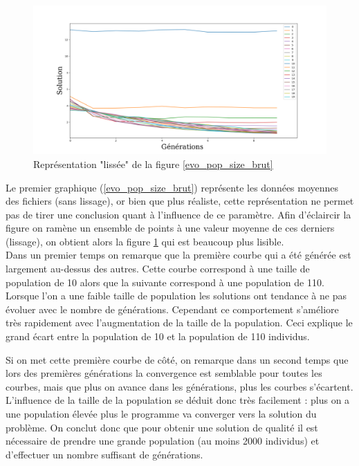 \documentclass[12pt]{report}
\begin{document}
        \begin{figure}[!]
          \centering
          \includegraphics[width=18cm]{img/evo_pop_size_moy.png}
          \caption{Représentation "lissée" de la figure \ref{evo_pop_size_brut}}
          \label{evo_pop_size_moy}
        \end{figure}
        Le premier graphique (\ref{evo_pop_size_brut}) représente les données moyennes des fichiers (sans lissage), or bien que plus réaliste, cette représentation ne permet pas de tirer une conclusion quant à l'influence de ce paramètre. Afin d'éclaircir la figure on ramène un ensemble de points à une valeur moyenne de ces derniers (lissage), on obtient alors la figure \ref{evo_pop_size_moy} qui est beaucoup plus lisible. \\

        Dans un premier temps on remarque que la première courbe qui a été générée est largement au-dessus des autres. Cette courbe correspond à une taille de population de 10 alors que la suivante correspond à une population de 110. Lorsque l'on a une faible taille de population les solutions ont tendance à ne pas évoluer avec le nombre de générations. Cependant ce comportement s'améliore très rapidement avec l'augmentation de la taille de la population. Ceci explique le grand écart entre la population de 10 et la population de 110 individus.

        Si on met cette première courbe de côté, on remarque dans un second temps que lors des premières générations la convergence est semblable pour toutes les courbes, mais que plus on avance dans les générations, plus les courbes s'écartent.
        \\ L'influence de la taille de la population se déduit donc très facilement : plus on a une population élevée plus le programme va converger vers la solution du problème. On conclut donc que pour obtenir une solution de qualité il est nécessaire de prendre une grande population (au moins 2000 individus) et d'effectuer un nombre suffisant de générations.
\end{document}
